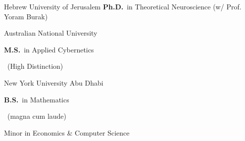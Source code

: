 	{%
		Hebrew University of Jerusalem}
	{%
		\textbf{Ph.D.}~in Theoretical Neuroscience
	}
	{%
	(w/ Prof. Yoram Burak)}


		{%
			Australian National University}
		{%
			\textbf{M.S.}~in Applied Cybernetics\begin{footnotesize}
				~(High Distinction)
			\end{footnotesize}}
		{%
		}

		{%
			New York University Abu Dhabi}
		{%
			\textbf{B.S.}~in Mathematics\begin{footnotesize}
				~(magna cum laude)
			\end{footnotesize}}
		{%
		Minor in Economics \& Computer Science}